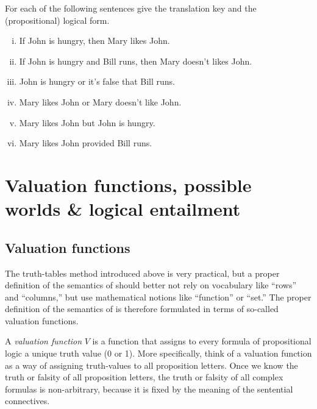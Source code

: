 \documentclass[nobib,nofonts]{tufte-handout}
\newcommand{\proplog}{\acro{PropLog}}
\begin{document}
\bigskip
\noindent \colorbox{mygray}{\centering
  \begin{minipage}{1.0\textwidth}

    \begin{exercise}
      For each of the following sentences give the translation key and the (propositional) logical form.
      \begin{enumerate}[(i)]
        \item If John is hungry, then Mary likes John.
        \item If John is hungry and Bill runs, then Mary doesn't likes John.
        \item John is hungry or it's false that Bill runs.
        \item Mary likes John or Mary doesn't like John.
        \item Mary likes John but John is hungry.
        \item Mary likes John provided Bill runs.
      \end{enumerate}
    \end{exercise}

  \end{minipage}
}

\newpage

\section{Valuation functions, possible worlds \& logical entailment}

\subsection{Valuation functions}

The truth-tables method introduced above is very practical, but a proper definition of the semantics of \proplog should better not rely on vocabulary like ``rows'' and ``columns,'' but use mathematical notions like ``function'' or ``set.''
The proper definition of the semantics of \proplog is therefore formulated in terms of so-called valuation functions.

A \emph{valuation function} $V$ is a function that assigns to every formula of propositional logic a unique truth value (0 or 1).
More specifically, think of a valuation function as a way of assigning truth-values to all proposition letters.
Once we know the truth or falsity of all proposition letters, the truth or falsity of all complex formulas is non-arbitrary, because it is fixed by the meaning of the sentential connectives.
\end{document}
